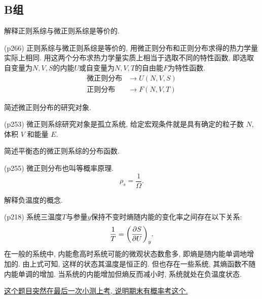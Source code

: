 \subsection{B组}
\begin{questions}
  \qt 解释正则系综与微正则系综是等价的.
\begin{solution}
  (p266) 正则系综与微正则系综是等价的, 用微正则分布和正则分布求得的热力学量实际上相同. 用这两个分布求热力学量实质上相当于选取不同的特性函数, 即选取自变量为$N,V,S$的内能$U$或自变量为$N,V,T$的自由能$F$为特性函数.
  \begin{align}
    \text{微正则分布} & \to U(N,V,S) \\
    \text{正则分布}   & \to F(N,V,T)
  \end{align}
\end{solution}
  \qt 简述微正则分布的研究对象.
\begin{solution}
  (p253) 微正则系综研究对象是孤立系统, 给定宏观条件就是具有确定的粒子数 $N$, 体积 $V$ 和能量 $E$.
\end{solution}
  \qt 简述平衡态的微正则系综的分布函数.
\begin{solution}
  (p255) 微正则分布也叫等概率原理.
  \begin{equation}
    \rho_s = \frac{1}{\varOmega}.
  \end{equation}
\end{solution}
  \qt 解释负温度的概念.
\begin{solution}
  (p218) 系统三温度$T$与参量$y$保持不变时熵随内能的变化率之间存在以下关系:
  \begin{equation}
    \frac{1}{T} = \qty(\pdv{S}{U})_y.
  \end{equation}
  在一般的系统中, 内能愈高时系统可能的微观状态数愈多, 即熵是随内能单调地增加的. 由上式可知, 这样的状态其温度是恒正的. 但也存在一些系统, 其熵函数不随内能单调的增加. 当系统的内能增加但熵反而减小时, 系统就处在负温度状态.

  \uline{这个题目突然在最后一次小测上考, 说明期末有概率考这个.}
\end{solution}
\end{questions}